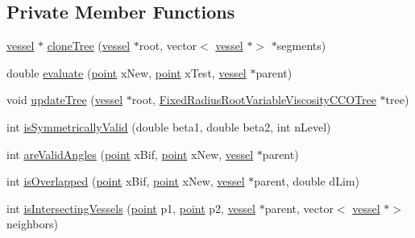 \subsection*{Private Member Functions}
\begin{DoxyCompactItemize}
\item 
\mbox{\hyperlink{structvessel}{vessel}} $\ast$ \mbox{\hyperlink{class_fixed_radius_root_variable_viscosity_c_c_o_tree_a6259eed5640b6346b017ebb1dd69d7a0}{clone\+Tree}} (\mbox{\hyperlink{structvessel}{vessel}} $\ast$root, vector$<$ \mbox{\hyperlink{structvessel}{vessel}} $\ast$$>$ $\ast$segments)
\item 
double \mbox{\hyperlink{class_fixed_radius_root_variable_viscosity_c_c_o_tree_aa58addfca3eba5e1ff11344b252e3f0f}{evaluate}} (\mbox{\hyperlink{structpoint}{point}} x\+New, \mbox{\hyperlink{structpoint}{point}} x\+Test, \mbox{\hyperlink{structvessel}{vessel}} $\ast$parent)
\item 
void \mbox{\hyperlink{class_fixed_radius_root_variable_viscosity_c_c_o_tree_a8aa4c0c4f66bb3ae658be185accddbbb}{update\+Tree}} (\mbox{\hyperlink{structvessel}{vessel}} $\ast$root, \mbox{\hyperlink{class_fixed_radius_root_variable_viscosity_c_c_o_tree}{Fixed\+Radius\+Root\+Variable\+Viscosity\+C\+C\+O\+Tree}} $\ast$tree)
\item 
int \mbox{\hyperlink{class_fixed_radius_root_variable_viscosity_c_c_o_tree_acb068f2e0b08b66a0229d6074e7f2bf8}{is\+Symmetrically\+Valid}} (double beta1, double beta2, int n\+Level)
\item 
int \mbox{\hyperlink{class_fixed_radius_root_variable_viscosity_c_c_o_tree_a6ebf58147a195a5669b9b8bcd98019cd}{are\+Valid\+Angles}} (\mbox{\hyperlink{structpoint}{point}} x\+Bif, \mbox{\hyperlink{structpoint}{point}} x\+New, \mbox{\hyperlink{structvessel}{vessel}} $\ast$parent)
\item 
int \mbox{\hyperlink{class_fixed_radius_root_variable_viscosity_c_c_o_tree_a55c76dd813ee5811dc5b20213bfd176f}{is\+Overlapped}} (\mbox{\hyperlink{structpoint}{point}} x\+Bif, \mbox{\hyperlink{structpoint}{point}} x\+New, \mbox{\hyperlink{structvessel}{vessel}} $\ast$parent, double d\+Lim)
\item 
int \mbox{\hyperlink{class_fixed_radius_root_variable_viscosity_c_c_o_tree_a6696183498a4e6479d33bb61a3dcfffa}{is\+Intersecting\+Vessels}} (\mbox{\hyperlink{structpoint}{point}} p1, \mbox{\hyperlink{structpoint}{point}} p2, \mbox{\hyperlink{structvessel}{vessel}} $\ast$parent, vector$<$ \mbox{\hyperlink{structvessel}{vessel}} $\ast$$>$ neighbors)
\item 

\end{DoxyCompactItemize}
